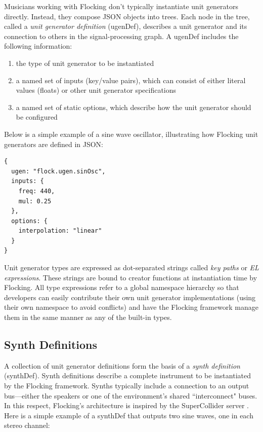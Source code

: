 \documentclass{article}
\begin{document}
Musicians working with Flocking don't typically instantiate unit generators directly. Instead, they compose JSON objects into trees. Each node in the tree, called a {\it unit generator definition} (ugenDef), describes a unit generator and its connection to others in the signal-processing graph. A ugenDef includes the following information:

\begin{enumerate}
\item the type of unit generator to be instantiated
\item a named set of inputs (key/value pairs), which can consist of either literal values (floats) or other unit generator specifications
\item a named set of static options, which describe how the unit generator should be configured
\end{enumerate}

Below is a simple example of a sine wave oscillator, illustrating how Flocking unit generators are defined in JSON:

\begin{verbatim}
{
  ugen: "flock.ugen.sinOsc",
  inputs: {
    freq: 440,
    mul: 0.25
  },
  options: {
    interpolation: "linear"
  }
}
\end{verbatim}

Unit generator types are expressed as dot-separated strings called {\it key paths} or {\it EL expressions}. These strings are bound to creator functions at instantiation time by Flocking. All type expressions refer to a global namespace hierarchy so that developers can easily contribute their own unit generator implementations (using their own namespace to avoid conflicts) and have the Flocking framework manage them in the same manner as any of the built-in types.

\subsection{Synth Definitions}

A collection of unit generator definitions form the basis of a {\it synth definition} (synthDef). Synth definitions describe a complete instrument to be instantiated by the Flocking framework. Synths typically include a connection to an output bus---either the speakers or one of the environment's shared ``interconnect" buses. In this respect, Flocking's architecture is inspired by the SuperCollider server \cite[pp.25]{wilson2011supercollider}. Here is a simple example of a synthDef that outputs two sine waves, one in each stereo channel:
\end{document}
